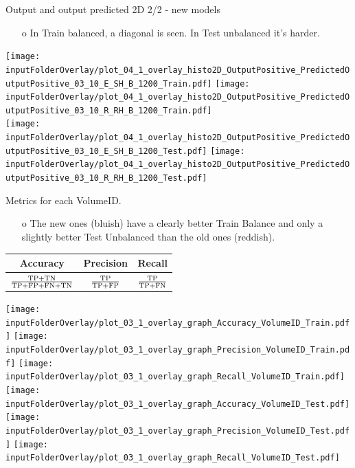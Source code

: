 \documentclass{beamer}
\begin{document}
\begin{frame}{Output and output predicted 2D 2/2 - new models}
\begin{enumerate}
\item[o] In Train balanced, a diagonal is seen. In Test unbalanced it's harder.
\end{enumerate}
\texttt{[image: \\inputFolderOverlay/plot\_04\_1\_overlay\_histo2D\_OutputPositive\_PredictedOutputPositive\_03\_10\_E\_SH\_B\_1200\_Train.pdf]}
\texttt{[image: \\inputFolderOverlay/plot\_04\_1\_overlay\_histo2D\_OutputPositive\_PredictedOutputPositive\_03\_10\_R\_RH\_B\_1200\_Train.pdf]}\\
\texttt{[image: \\inputFolderOverlay/plot\_04\_1\_overlay\_histo2D\_OutputPositive\_PredictedOutputPositive\_03\_10\_E\_SH\_B\_1200\_Test.pdf]}
\texttt{[image: \\inputFolderOverlay/plot\_04\_1\_overlay\_histo2D\_OutputPositive\_PredictedOutputPositive\_03\_10\_R\_RH\_B\_1200\_Test.pdf]}\\
\end{frame}
\clearpage

\begin{frame}{Metrics for each VolumeID.}
\begin{enumerate}
\item[o] The new ones (bluish) have a clearly better Train Balance and only a slightly better Test Unbalanced than the old ones (reddish).
\end{enumerate}
\centering
\begin{center}
\begin{tabular}{ |c|c|c| } 
\hline
Accuracy & Precision & Recall \\ 
\hline
$\frac{\TP+\TN}{\TP+\FP+\FN+\TN}$ & $\frac{\TP}{\TP+\FP}$  & $\frac{\TP}{\TP+\FN}$ \\ 
\hline
\end{tabular}
\end{center}
\texttt{[image: \\inputFolderOverlay/plot\_03\_1\_overlay\_graph\_Accuracy\_VolumeID\_Train.pdf]}
\texttt{[image: \\inputFolderOverlay/plot\_03\_1\_overlay\_graph\_Precision\_VolumeID\_Train.pdf]}
\texttt{[image: \\inputFolderOverlay/plot\_03\_1\_overlay\_graph\_Recall\_VolumeID\_Train.pdf]}\\
\texttt{[image: \\inputFolderOverlay/plot\_03\_1\_overlay\_graph\_Accuracy\_VolumeID\_Test.pdf]}
\texttt{[image: \\inputFolderOverlay/plot\_03\_1\_overlay\_graph\_Precision\_VolumeID\_Test.pdf]}
\texttt{[image: \\inputFolderOverlay/plot\_03\_1\_overlay\_graph\_Recall\_VolumeID\_Test.pdf]}\\
\end{frame}
\end{document}
